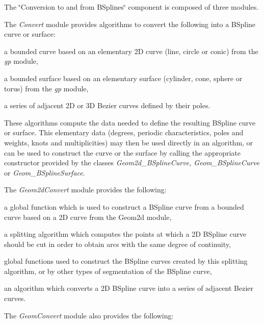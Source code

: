 The \char`\"{}\+Conversion to and from B\+Splines\char`\"{} component is composed of three modules.

The {\itshape Convert} module provides algorithms to convert the following into a B\+Spline curve or surface\+:


\begin{DoxyItemize}
\item a bounded curve based on an elementary 2D curve (line, circle or conic) from the {\itshape gp} module,
\item a bounded surface based on an elementary surface (cylinder, cone, sphere or torus) from the {\itshape gp} module,
\item a series of adjacent 2D or 3D Bezier curves defined by their poles.
\end{DoxyItemize}

These algorithms compute the data needed to define the resulting B\+Spline curve or surface. This elementary data (degrees, periodic characteristics, poles and weights, knots and multiplicities) may then be used directly in an algorithm, or can be used to construct the curve or the surface by calling the appropriate constructor provided by the classes {\itshape Geom2d\+\_\+\+B\+Spline\+Curve, Geom\+\_\+\+B\+Spline\+Curve} or {\itshape Geom\+\_\+\+B\+Spline\+Surface}.

The {\itshape Geom2d\+Convert} module provides the following\+:


\begin{DoxyItemize}
\item a global function which is used to construct a B\+Spline curve from a bounded curve based on a 2D curve from the Geom2d module,
\item a splitting algorithm which computes the points at which a 2D B\+Spline curve should be cut in order to obtain arcs with the same degree of continuity,
\item global functions used to construct the B\+Spline curves created by this splitting algorithm, or by other types of segmentation of the B\+Spline curve,
\item an algorithm which converts a 2D B\+Spline curve into a series of adjacent Bezier curves.
\end{DoxyItemize}

The {\itshape Geom\+Convert} module also provides the following\+:



